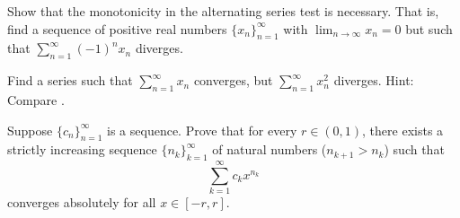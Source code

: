 \begin{exercise}[Challenging]
Show that the monotonicity in the alternating series test
is necessary.  That is, find a sequence of positive real numbers
$\{ x_n \}_{n=1}^\infty$ with $\lim_{n\to\infty} x_n = 0$ but such that
$\sum_{n=1}^\infty {(-1)}^n x_n$ diverges.
\end{exercise}

\begin{exercise}
Find a series such that $\sum_{n=1}^\infty x_n$ converges,
but $\sum_{n=1}^\infty x_n^2$ diverges.
Hint: Compare .
\end{exercise}

\begin{exercise}
Suppose $\{ c_n \}_{n=1}^\infty$ is a sequence.  Prove that for every $r \in (0,1)$,
there exists a strictly increasing sequence $\{ n_k \}_{k=1}^\infty$ of natural numbers
($n_{k+1} > n_k$) such that
\begin{equation*}
\sum_{k=1}^\infty c_k x^{n_k}
\end{equation*}
converges absolutely for all $x \in [-r,r]$.
\end{exercise}

